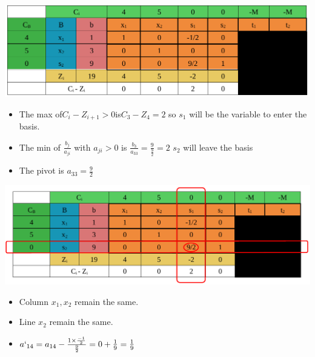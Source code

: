 \vspace{0.25cm}



\begin{center}
    \includegraphics{Chapters/Simplexe/EX/EX2/ex2.5.pdf}
\end{center}

\vspace{0.25cm}
\begin{itemize}   
    \item The max of\hspace{0.2cm}\(C_i - Z_{i+1} > 0\)\hspace{0.2cm}is\hspace{0.2cm}\(C_3 - Z_4 = 2\)\hspace{0.1cm} so \(s_1\) 
will be the variable to enter the basis.
\item The min of \hspace{0.1cm}\(\frac{b_j}{a_{ji}}\)\hspace{0.1cm} with \(a_{ji} > 0\)\hspace{0.1cm} is \hspace{0.1cm} \(\frac{b_3}{a_{33}} = \frac{9}{\frac{9}{2}} = 2\)\hspace{0.35cm} \(s_2\)
will leave the basis
\item The pivot is \(a_{33} = \frac{9}{2}\)
 
\end{itemize}


\begin{center}
    \includegraphics{Chapters/Simplexe/EX/EX2/ex2.6.pdf}
\end{center}

\vspace{0.25cm}
\begin{itemize}
 \item Column \(x_1 , x_2\) remain the same.
 \item Line \(x_2\) remain the same.
 \item \(a`_{14} = a_{14} - \frac{1\times\frac{-1}{2}}{\frac{9}{2}} = 0 + \frac{1}{9} = \frac{1}{9}\)
\end{itemize}

